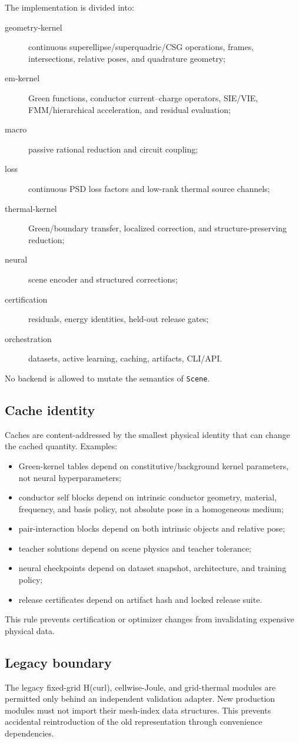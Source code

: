 The implementation is divided into:
\begin{description}
\item[geometry-kernel] continuous superellipse/superquadric/CSG operations,
  frames, intersections, relative poses, and quadrature geometry;
\item[em-kernel] Green functions, conductor current--charge operators, SIE/VIE,
  FMM/hierarchical acceleration, and residual evaluation;
\item[macro] passive rational reduction and circuit coupling;
\item[loss] continuous PSD loss factors and low-rank thermal source channels;
\item[thermal-kernel] Green/boundary transfer, localized correction, and
  structure-preserving reduction;
\item[neural] scene encoder and structured corrections;
\item[certification] residuals, energy identities, held-out release gates;
\item[orchestration] datasets, active learning, caching, artifacts, CLI/API.
\end{description}

No backend is allowed to mutate the semantics of \texttt{Scene}.

\subsection{Cache identity}

Caches are content-addressed by the smallest physical identity that can change
the cached quantity. Examples:
\begin{itemize}
\item Green-kernel tables depend on constitutive/background kernel parameters,
      not neural hyperparameters;
\item conductor self blocks depend on intrinsic conductor geometry, material,
      frequency, and basis policy, not absolute pose in a homogeneous medium;
\item pair-interaction blocks depend on both intrinsic objects and relative
      pose;
\item teacher solutions depend on scene physics and teacher tolerance;
\item neural checkpoints depend on dataset snapshot, architecture, and training
      policy;
\item release certificates depend on artifact hash and locked release suite.
\end{itemize}
This rule prevents certification or optimizer changes from invalidating
expensive physical data.

\subsection{Legacy boundary}

The legacy fixed-grid H(curl), cellwise-Joule, and grid-thermal modules are
permitted only behind an independent validation adapter. New production modules
must not import their mesh-index data structures. This prevents accidental
reintroduction of the old representation through convenience dependencies.
